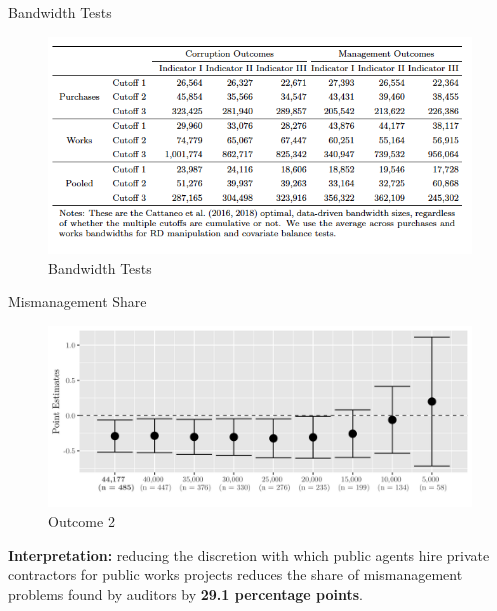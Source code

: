 \documentclass[10pt,ignorenonframetext,]{beamer}
\begin{document}
\begin{frame}{Bandwidth Tests}
\protect\hypertarget{bandwidth-tests}{}

\begin{figure}
\centering
\includegraphics{./images/bandwidth.png}
\caption{Bandwidth Tests}
\end{figure}

\end{frame}

\begin{frame}{Mismanagement Share}
\protect\hypertarget{mismanagement-share}{}

\begin{figure}
\centering
\includegraphics{./images/mismanagementplot2.png}
\caption{Outcome 2}
\end{figure}

\textbf{Interpretation:} reducing the discretion with which public
agents hire private contractors for public works projects reduces the
share of mismanagement problems found by auditors by \textbf{29.1
percentage points}.

\end{frame}
\end{document}
